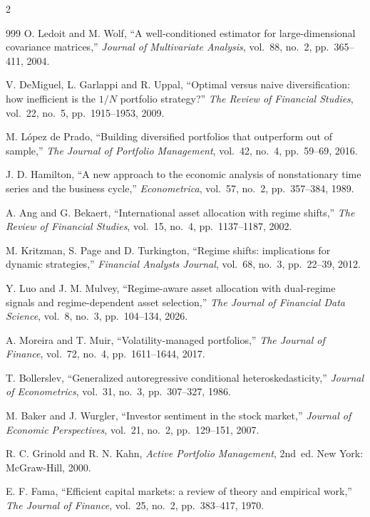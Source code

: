 \begin{footnotesize}
\begin{multicols}{2}
\begin{thebibliography}{999}
 O. Ledoit and M. Wolf, ``A well-conditioned estimator for
large-dimensional covariance matrices,'' \emph{Journal of Multivariate Analysis}, vol.~88,
no.~2, pp.~365--411, 2004.

 V. DeMiguel, L. Garlappi and R. Uppal, ``Optimal versus naive
diversification: how inefficient is the $1/N$ portfolio strategy?'' \emph{The Review of
Financial Studies}, vol.~22, no.~5, pp.~1915--1953, 2009.

 M. L\'opez de Prado, ``Building diversified portfolios that
outperform out of sample,'' \emph{The Journal of Portfolio Management}, vol.~42, no.~4,
pp.~59--69, 2016.

 J. D. Hamilton, ``A new approach to the economic analysis of
nonstationary time series and the business cycle,'' \emph{Econometrica}, vol.~57, no.~2,
pp.~357--384, 1989.

 A. Ang and G. Bekaert, ``International asset allocation with regime
shifts,'' \emph{The Review of Financial Studies}, vol.~15, no.~4, pp.~1137--1187, 2002.

 M. Kritzman, S. Page and D. Turkington, ``Regime shifts: implications
for dynamic strategies,'' \emph{Financial Analysts Journal}, vol.~68, no.~3, pp.~22--39,
2012.

 Y. Luo and J. M. Mulvey, ``Regime-aware asset allocation with
dual-regime signals and regime-dependent asset selection,'' \emph{The Journal of Financial
Data Science}, vol.~8, no.~3, pp.~104--134, 2026.

 A. Moreira and T. Muir, ``Volatility-managed portfolios,'' \emph{The
Journal of Finance}, vol.~72, no.~4, pp.~1611--1644, 2017.

 T. Bollerslev, ``Generalized autoregressive conditional
heteroskedasticity,'' \emph{Journal of Econometrics}, vol.~31, no.~3, pp.~307--327, 1986.

 M. Baker and J. Wurgler, ``Investor sentiment in the stock
market,'' \emph{Journal of Economic Perspectives}, vol.~21, no.~2, pp.~129--151, 2007.

 R. C. Grinold and R. N. Kahn, \emph{Active Portfolio Management},
2nd~ed. New York: McGraw-Hill, 2000.

 E. F. Fama, ``Efficient capital markets: a review of theory and empirical
work,'' \emph{The Journal of Finance}, vol.~25, no.~2, pp.~383--417, 1970.


\end{thebibliography}
\end{multicols}
\end{footnotesize}

